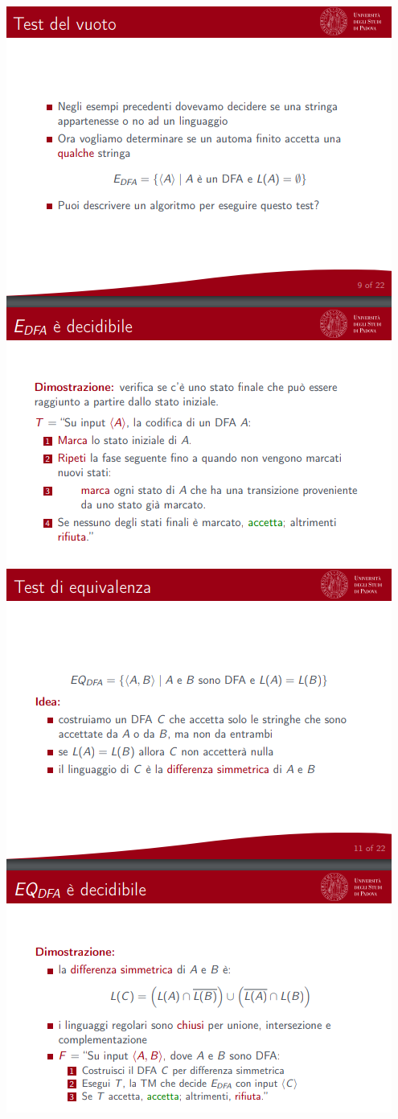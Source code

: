 \documentclass[]{article}
\begin{document}
\begin{center}
				\includegraphics[scale=0.8]{problemaRegolare5.png}
				\includegraphics[scale=0.8]{problemaRegolare6.png}

\end{center}
\end{document}
